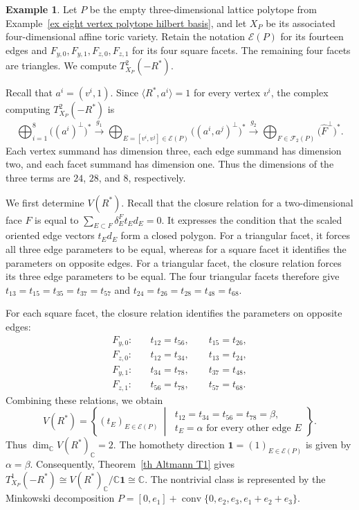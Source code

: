 \documentclass[11pt]{amsart}
\numberwithin{equation}{section}
\theoremstyle{plain}
\theoremstyle{definition}
\newtheorem{example}[theorem]{Example}
\newcommand{\0}{$0$-mutable}
\newcommand{\CC}{\ensuremath{\mathbb{C}}}
\renewcommand{\1}{$1$-rigid}
\renewcommand{\0}{$0$-mutable}
\begin{document}
\begin{example}\label{ex eight vertex T2}
Let \(P\) be the empty three-dimensional lattice polytope from
Example~\ref{ex eight vertex polytope hilbert basis}, and let \(X_P\)
be its associated four-dimensional affine toric variety. Retain the
notation \(\mathcal E(P)\) for its fourteen edges and
\(F_{y,0},F_{y,1},F_{z,0},F_{z,1}\) for its four square facets. The
remaining four facets are triangles. We compute
\(T^2_{X_P}(-R^*)\).

Recall that \(a^i=(v^i,1)\). Since
\(\langle R^*,a^i\rangle=1\) for every vertex \(v^i\), the complex
computing \(T^2_{X_P}(-R^*)\) is
\begin{equation}\label{eq eight vertex T2 complex}
\bigoplus_{i=1}^{8}\bigl((a^i)^\perp\bigr)^*
\xrightarrow{g_1}
\bigoplus_{E=[v^i,v^j]\in\mathcal E(P)}
\bigl((a^i,a^j)^\perp\bigr)^*
\xrightarrow{g_2}
\bigoplus_{F\in\mathcal F_2(P)}
\bigl(\widehat F^\perp\bigr)^*.
\end{equation}
Each vertex summand has dimension three, each edge summand has dimension
two, and each facet summand has dimension one. Thus the dimensions of
the three terms are \(24\), \(28\), and \(8\), respectively.

We first determine \(V(R^*)\). 
Recall that the closure relation for a two-dimensional face \(F\) is equal to
$
\sum_{E\subset F}\delta_E^F t_Ed_E=0.
$
It expresses the condition that the scaled oriented edge vectors
\(t_Ed_E\) form a closed polygon. For a triangular facet, it forces all
three edge parameters to be equal, whereas for a square facet it
identifies the parameters on opposite edges.
For a triangular facet, the closure
relation forces its three edge parameters to be equal. The four
triangular facets therefore give
\(t_{13}=t_{15}=t_{35}=t_{37}=t_{57}\) and
\(t_{24}=t_{26}=t_{28}=t_{48}=t_{68}\).

For each square facet, the closure relation identifies the parameters
on opposite edges:
\[
\begin{aligned}
F_{y,0}:&\quad t_{12}=t_{56},\qquad t_{15}=t_{26},
\\
F_{z,0}:&\quad t_{12}=t_{34},\qquad t_{13}=t_{24},
\\
F_{y,1}:&\quad t_{34}=t_{78},\qquad t_{37}=t_{48},
\\
F_{z,1}:&\quad t_{56}=t_{78},\qquad t_{57}=t_{68}.
\end{aligned}
\]
Combining these relations, we obtain
\[
V(R^*)
=
\left\{
(t_E)_{E\in\mathcal E(P)}
\ \middle|\
\begin{array}{l}
t_{12}=t_{34}=t_{56}=t_{78}=\beta,\\
t_E=\alpha\text{ for every other edge }E
\end{array}
\right\}.
\]
Thus \(\dim_{\CC}V(R^*)_{\CC}=2\). The homothety direction
\(\mathbf 1=(1)_{E\in\mathcal E(P)}\) is given by
\(\alpha=\beta\). Consequently, Theorem~\ref{th Altmann T1} gives
\(T^1_{X_P}(-R^*)\cong V(R^*)_{\CC}/\CC\mathbf 1\cong\CC\).
The nontrivial class is represented by the Minkowski decomposition
\(P=[0,e_1]+\operatorname{conv}\{0,e_2,e_3,e_1+e_2+e_3\}\).


\end{example}
\end{document}
